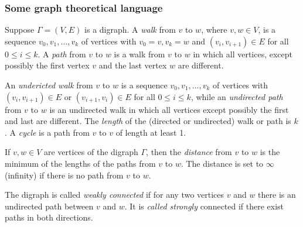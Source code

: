 \subsubsection{Some graph theoretical language}
Suppose $ \Gamma = (V,E) $ is a digraph. A \emph{walk} from $v$ to $w$, where $v,w \in V$, is a sequence $ v_0,v_1,\dots,v_k $ of vertices with $ v_0 = v, v_k = w $ and $ (v_i, v_{i+1}) \in E $ for all $ 0 \leq i \le k $.
A \emph{path} from $v$ to $w$ is a walk from $v$ to $w$ in which all vertices, except possibly the first vertex $v$ and the last vertex $w$ are different. \par
An \emph{undericted walk} from $v$ to $w$ is a sequence $ v_0,v_1,\dots,v_k $ of vertices with $ (v_i,v_{i+1}) \in E $ or $ (v_{i+1}, v_i) \in E $ for all $ 0 \leq i \le k $, while an \emph{undirected path} from $v$ to $w$ is an undirected walk in which all vertices except possibly the first and last are different.
The \emph{length} of the (directed or undirected) walk or path is $k$. A \emph{cycle} is a path from $v$ to $v$ of length at least 1. \par
If $v,w \in V$ are vertices of the digraph $\Gamma$, then the \emph{distance} from $v$ to $w$ is the minimum of the lengths of
the paths from $v$ to $w$. The distance is set to $\infty$ (infinity) if there is no path from $v$ to $w$. \par
The digraph is called \emph{weakly connected} if for any two vertices $v$ and $w$ there is an undirected path between
$v$ and $w$. It is \emph{called strongly} connected if there exist paths in both directions. \par

